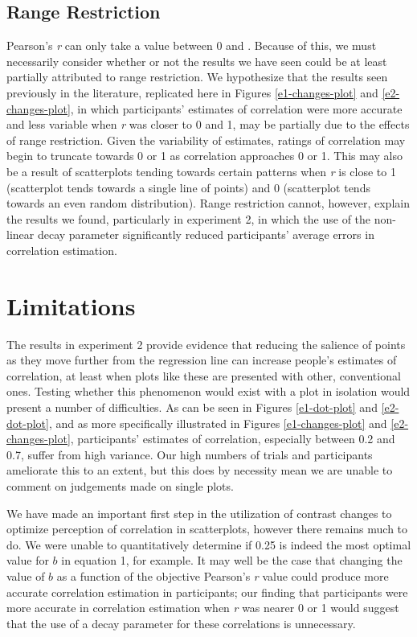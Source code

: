 \documentclass[preprint, 3p,
authoryear]{elsarticle} %
\begin{document}
\hypertarget{range-restriction}{%
\subsection{Range Restriction}\label{range-restriction}}

Pearson's \emph{r} can only take a value between 0 and
\textbar. Because of this, we must necessarily consider whether
or not the results we have seen could be at least partially attributed
to range restriction. We hypothesize that the results seen previously in
the literature, replicated here in Figures \ref{e1-changes-plot} and
\ref{e2-changes-plot}, in which participants' estimates of correlation
were more accurate and less variable when \emph{r} was closer to 0 and
1, may be partially due to the effects of range restriction. Given the
variability of estimates, ratings of correlation may begin to truncate
towards 0 or 1 as correlation approaches 0 or 1. This may also be a
result of scatterplots tending towards certain patterns when \emph{r} is
close to 1 (scatterplot tends towards a single line of points) and 0
(scatterplot tends towards an even random distribution). Range
restriction cannot, however, explain the results we found, particularly
in experiment 2, in which the use of the non-linear decay parameter
significantly reduced participants' average errors in correlation
estimation.

\hypertarget{limitations}{%
\section{Limitations}\label{limitations}}

The results in experiment 2 provide evidence that reducing the salience
of points as they move further from the regression line can increase
people's estimates of correlation, at least when plots like these are
presented with other, conventional ones. Testing whether this phenomenon
would exist with a plot in isolation would present a number of
difficulties. As can be seen in Figures \ref{e1-dot-plot} and
\ref{e2-dot-plot}, and as more specifically illustrated in Figures
\ref{e1-changes-plot} and \ref{e2-changes-plot}, participants' estimates
of correlation, especially between 0.2 and 0.7, suffer from high
variance. Our high numbers of trials and participants ameliorate this to
an extent, but this does by necessity mean we are unable to comment on
judgements made on single plots.

We have made an important first step in the utilization of contrast
changes to optimize perception of correlation in scatterplots, however
there remains much to do. We were unable to quantitatively determine if
0.25 is indeed the most optimal value for \(b\) in equation 1, for
example. It may well be the case that changing the value of \(b\) as a
function of the objective Pearson's \emph{r} value could produce more
accurate correlation estimation in participants; our finding that
participants were more accurate in correlation estimation when \emph{r}
was nearer 0 or 1 would suggest that the use of a decay parameter for
these correlations is unnecessary.
\end{document}
